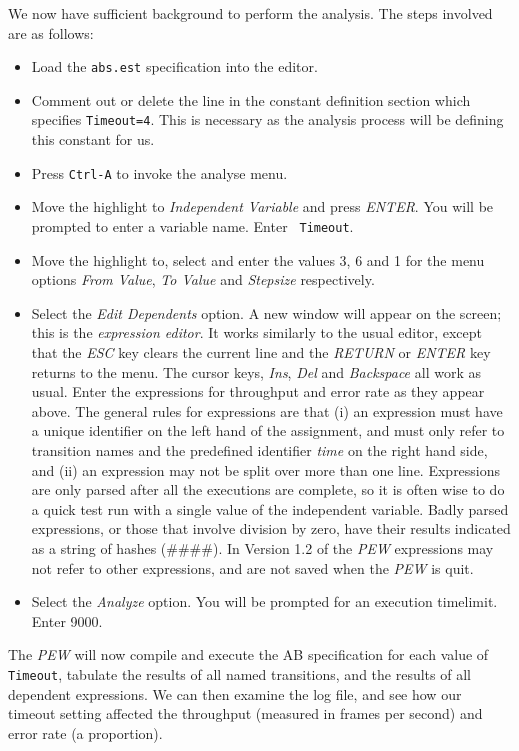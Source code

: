 We now have sufficient background to perform the analysis. The steps
involved are as follows:

\begin{itemize}
\item Load the {\tt abs.est} specification into the editor.
\item Comment out or delete the line in the constant definition
section which specifies {\tt Timeout=4}. This is necessary as the
analysis process will be defining this constant for us.
\item Press {\tt Ctrl-A} to invoke the analyse menu.
\item Move the highlight to {\em Independent Variable} and press {\em
ENTER}. You will be prompted to enter a variable name. Enter {\tt
Timeout}.
\item Move the highlight to, select and enter the values 3, 6 and 1
for the menu options {\em From Value}, {\em To Value} and {\em
Stepsize} respectively.
\item Select the {\em Edit Dependents} option. A new window will
appear on the screen; this is the {\em expression editor}. It works
similarly to the usual editor, except that the {\em ESC} key clears
the current line and the {\em RETURN} or {\em ENTER} key returns to
the menu. The cursor keys, {\em Ins}, {\em Del} and {\em Backspace}
all work as usual. Enter the expressions for throughput and error
rate as they appear above. The general rules for expressions are that
(i) an expression must have a unique identifier on the left hand of the
assignment, and must only refer to transition names and the
predefined identifier {\em time} on the right hand side, and (ii) an
expression may not be split over more than one line. Expressions are
only parsed after all the executions are complete, so it is often
wise to do a quick test run with a single value of the independent
variable. Badly parsed expressions, or those that involve division by
zero, have their results indicated as a string of hashes (\#\#\#\#). In
Version 1.2 of the {\em PEW} expressions may not refer to other
expressions, and are not saved when the {\em PEW} is quit.
\item Select the {\em Analyze} option. You will be prompted for an
execution timelimit. Enter 9000.
\end{itemize}

The {\em PEW} will now compile and execute the AB specification for
each value of {\tt Timeout}, tabulate the results of all named
transitions, and the results of all dependent expressions. We can
then examine the log file, and see how our timeout setting affected
the throughput (measured in frames per second) and error rate (a
proportion).

